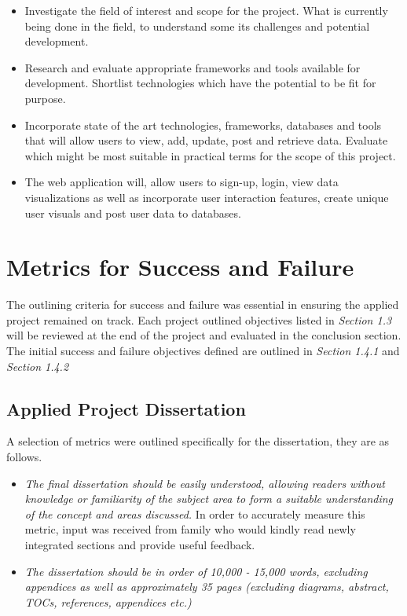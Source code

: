 \begin{itemize}
  \item Investigate the field of interest and scope for the project.
  What is currently being done in the field, to understand some its challenges and potential development.
  
  \item Research and evaluate appropriate frameworks and tools available for development.
  Shortlist technologies which have the potential to be fit for purpose.
  
  \item Incorporate state of the art technologies, frameworks, databases and tools that will allow users to view, add, update, post and retrieve data.
  Evaluate which might be most suitable in practical terms for the scope of this project.
  \item The web application will, allow users to sign-up, login, view data visualizations as well as incorporate user interaction features, create unique user visuals and post user data to databases.
\end{itemize}

\section{Metrics for Success and Failure}
The outlining criteria for success and failure was essential in ensuring the applied project remained on track.  Each project outlined objectives listed in \emph{Section 1.3} will be reviewed at the end of the project and evaluated in the conclusion section. The initial success and failure objectives defined are outlined in \emph{Section 1.4.1} and \emph{Section 1.4.2}

\vspace{5mm} %

\subsection{Applied Project Dissertation}
A selection of metrics were outlined specifically for the dissertation, they are as follows.

\begin{itemize}

    \item \emph{The final dissertation should be easily understood, allowing readers without knowledge or familiarity of the subject area to form a suitable understanding of the concept and areas discussed.} In order to accurately measure this metric, input was received from family who would kindly read newly integrated sections and provide useful feedback.

    \item \emph{The  dissertation should be in order of 10,000 - 15,000 words, excluding appendices as well as approximately 35 pages (excluding diagrams, abstract, TOCs, references, appendices etc.)}

\end{itemize}

